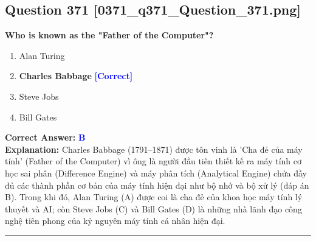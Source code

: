\documentclass[11pt,a4paper]{article}
\begin{document}
\begin{minipage}{\textwidth}
\subsection*{Question 371 \quad \footnotesize{[0371\_q371\_Question\_371.png]}}
\noindent \textbf{Who is known as the "Father of the Computer"?}

\begin{enumerate}[label=\Alph*.]
    \item Alan Turing
    \item \textbf{Charles Babbage} \hfill \textcolor{blue}{\textbf{[Correct]}}
    \item Steve Jobs
    \item Bill Gates
\end{enumerate}

\noindent \textbf{Correct Answer:} \textcolor{blue}{\textbf{B}} \\[2pt]
\noindent \textbf{Explanation:} Charles Babbage (1791–1871) được tôn vinh là 'Cha đẻ của máy tính' (Father of the Computer) vì ông là người đầu tiên thiết kế ra máy tính cơ học sai phân (Difference Engine) và máy phân tích (Analytical Engine) chứa đầy đủ các thành phần cơ bản của máy tính hiện đại như bộ nhớ và bộ xử lý (đáp án B). Trong khi đó, Alan Turing (A) được coi là cha đẻ của khoa học máy tính lý thuyết và AI; còn Steve Jobs (C) và Bill Gates (D) là những nhà lãnh đạo công nghệ tiên phong của kỷ nguyên máy tính cá nhân hiện đại.

\par\vspace{0.3cm}
\hrule
\vspace{0.3cm}
\end{minipage}
\end{document}
